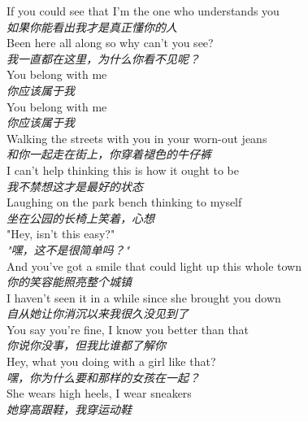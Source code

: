 \begin{spacing}{1.5}
\begin{flushleft}
If you could see that I'm the one who understands you\\
\textit{如果你能看出我才是真正懂你的人}\\[0.5em]

Been here all along so why can't you see?\\
\textit{我一直都在这里，为什么你看不见呢？}\\[0.5em]

You belong with me\\
\textit{你应该属于我}\\[0.5em]

You belong with me\\
\textit{你应该属于我}\\[0.5em]

Walking the streets with you in your worn-out jeans\\
\textit{和你一起走在街上，你穿着褪色的牛仔裤}\\[0.5em]

I can't help thinking this is how it ought to be\\
\textit{我不禁想这才是最好的状态}\\[0.5em]

Laughing on the park bench thinking to myself\\
\textit{坐在公园的长椅上笑着，心想}\\[0.5em]

"Hey, isn't this easy?"\\
\textit{"嘿，这不是很简单吗？"}\\[0.5em]

And you've got a smile that could light up this whole town\\
\textit{你的笑容能照亮整个城镇}\\[0.5em]

I haven't seen it in a while since she brought you down\\
\textit{自从她让你消沉以来我很久没见到了}\\[0.5em]

You say you're fine, I know you better than that\\
\textit{你说你没事，但我比谁都了解你}\\[0.5em]

Hey, what you doing with a girl like that?\\
\textit{嘿，你为什么要和那样的女孩在一起？}\\[0.5em]

She wears high heels, I wear sneakers\\
\textit{她穿高跟鞋，我穿运动鞋}\\[0.5em]


\end{flushleft}
\end{spacing}
